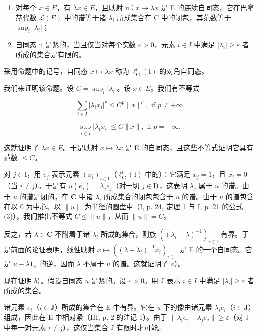 \begin{enumerate}
\def\labelenumi{\alph{enumi})}
\item
  对每个 \(x \in E\)，有 \(\lambda x \in E\)，且映射 u：\(x \mapsto \lambda x\) 是 E 的连续自同态，它在巴拿赫代数 \(\mathcal{L}(E)\) 中的谱等于诸 \(\lambda_{i}\) 所成集合在 C 中的闭包，其范数等于 \(\sup_{i} |\lambda_{i}|\)；
\item
  自同态 u 是紧的，当且仅当对每个实数 \(\varepsilon > 0\)，元素 \(i \in I\) 中满足 \(|\lambda_{i}| \geqslant \varepsilon\) 者所成的集合是有限的。
\end{enumerate}

采用命题中的记号，自同态 \(x \mapsto \lambda x\) 称为 \(\ell_{\mathbf{C}}^{p}(\mathrm{I})\) 的对角自同态。

我们来证明该命题。设 \(C = \sup_{i} |\lambda_{i}|\)。设 \(x \in E\)。我们有不等式

\[
\sum_ {i \in I} | \lambda_ {i} x _ {i} | ^ {p} \leqslant C ^ {p} \| x \| ^ {p}, \text {   if   } p \neq + \infty
\]

\[
\sup _ {i \in I} | \lambda_ {i} x _ {i} | \leqslant C \| x \|, \text {   if   } p = + \infty .
\]

这就证明了 \(\lambda x \in E\)。于是映射 \(x \mapsto \lambda x\) 是 E 的自同态，且这些不等式证明它具有范数 \(\leqslant C\)。

对 \(j \in \mathrm{I}\)，用 \(e_j\) 表示元素 \((x_i)_{i \in \mathrm{I}}\)（\(\ell_{\mathbf{C}}^p(\mathrm{I})\) 中的）：它满足 \(x_j = 1\)，且 \(x_i = 0\)（当 \(i \neq j\)）。于是有 \(u(e_j) = \lambda_j e_j\)（对一切 \(j \in \mathrm{I}\)），这表明 \(\lambda_j\) 属于 \(u\) 的谱。由于 \(u\) 的谱是闭的，在 \(\mathbf{C}\) 中诸 \(\lambda_i\) 所成集合的闭包包含于 \(u\) 的谱。由于 \(u\) 的谱包含在以 0 为中心、以 \(\|u\|\) 为半径的圆盘中（I, p. 24, 定理 1 与 I, p. 21 的公式 (3)），我们推出不等式 \(C \leqslant \|u\|\)，从而 \(\|u\| = C\)。

反之，若 \(\lambda \in \mathbf{C}\) 不附着于诸 \(\lambda_{i}\) 所成的集合，则族 \(((\lambda_{i} - \lambda)^{-1})_{i\in \mathrm{I}}\) 有界。于是前面的论证表明，线性映射 \(x\mapsto ((\lambda -\lambda_i)^{-1}x_i)_{i\in \mathrm{I}}\) 是 E 的一个自同态。它是 \(u - \lambda 1_{\mathrm{E}}\) 的逆，因而 \(\lambda\) 不属于 \(u\) 的谱。这就证明了 \(a\)）。

现在证明 \(b\)）。假设自同态 \(u\) 是紧的。设 \(\varepsilon > 0\)。用 J 表示 \(i \in I\) 中满足 \(|\lambda_i| \geqslant \varepsilon\) 者所成的集合。

诸元素 \(e_i\)（\(i \in \mathbf{J}\)）所成的集合在 E 中有界。它在 \(u\) 下的像由诸元素 \(\lambda_i e_i\)（\(i \in \mathbf{J}\)）组成，因此在 E 中相对紧（III, p. 2 的注记 1）。由于 \(\| \lambda_i e_i - \lambda_j e_j \| \geqslant \varepsilon\)（对 J 中每一对元素 \(i \neq j\)），这仅当集合 J 有限时才可能。

